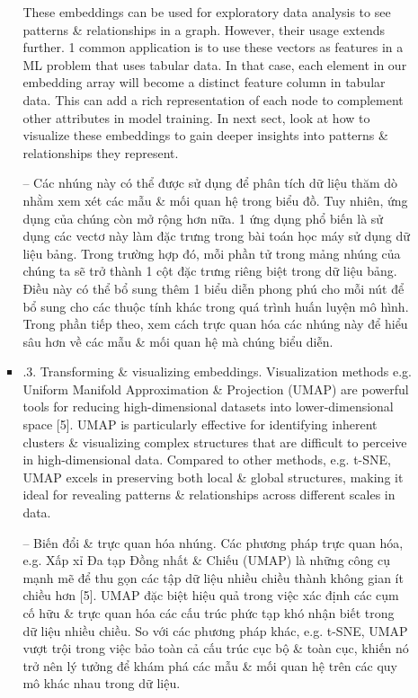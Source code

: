 \documentclass{article}
\begin{document}
\begin{itemize}
\begin{itemize}
\begin{itemize}
           These embeddings can be used for exploratory data analysis to see patterns \& relationships in a graph. However, their usage extends further. 1 common application is to use these vectors as features in a ML problem that uses tabular data. In that case, each element in our embedding array will become a distinct feature column in tabular data. This can add a rich representation of each node to complement other attributes in model training. In next sect, look at how to visualize these embeddings to gain deeper insights into patterns \& relationships they represent.

           -- Các nhúng này có thể được sử dụng để phân tích dữ liệu thăm dò nhằm xem xét các mẫu \& mối quan hệ trong biểu đồ. Tuy nhiên, ứng dụng của chúng còn mở rộng hơn nữa. 1 ứng dụng phổ biến là sử dụng các vectơ này làm đặc trưng trong bài toán học máy sử dụng dữ liệu bảng. Trong trường hợp đó, mỗi phần tử trong mảng nhúng của chúng ta sẽ trở thành 1 cột đặc trưng riêng biệt trong dữ liệu bảng. Điều này có thể bổ sung thêm 1 biểu diễn phong phú cho mỗi nút để bổ sung cho các thuộc tính khác trong quá trình huấn luyện mô hình. Trong phần tiếp theo, xem cách trực quan hóa các nhúng này để hiểu sâu hơn về các mẫu \& mối quan hệ mà chúng biểu diễn.
           \item {.3. Transforming \& visualizing embeddings.} Visualization methods e.g. Uniform Manifold Approximation \& Projection (UMAP) are powerful tools for reducing high-dimensional datasets into lower-dimensional space [5]. UMAP is particularly effective for identifying inherent clusters \& visualizing complex structures that are difficult to perceive in high-dimensional data. Compared to other methods, e.g. t-SNE, UMAP excels in preserving both local \& global structures, making it ideal for revealing patterns \& relationships across different scales in data.

           -- {\sf Biến đổi \& trực quan hóa nhúng.} Các phương pháp trực quan hóa, e.g. Xấp xỉ Đa tạp Đồng nhất \& Chiếu (UMAP) là những công cụ mạnh mẽ để thu gọn các tập dữ liệu nhiều chiều thành không gian ít chiều hơn [5]. UMAP đặc biệt hiệu quả trong việc xác định các cụm cố hữu \& trực quan hóa các cấu trúc phức tạp khó nhận biết trong dữ liệu nhiều chiều. So với các phương pháp khác, e.g. t-SNE, UMAP vượt trội trong việc bảo toàn cả cấu trúc cục bộ \& toàn cục, khiến nó trở nên lý tưởng để khám phá các mẫu \& mối quan hệ trên các quy mô khác nhau trong dữ liệu.


\end{itemize}
\end{itemize}
\end{itemize}
\end{document}
